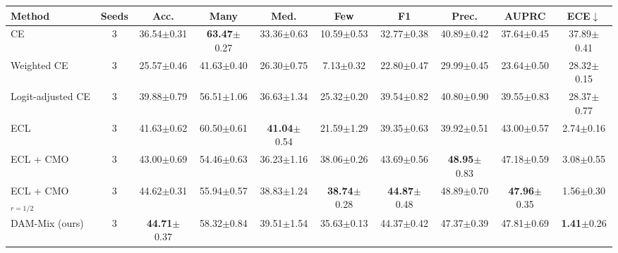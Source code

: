 \begin{tabular}{l c cccccccc}
\toprule
Method & Seeds & Acc. & Many & Med. & Few & F1 & Prec. & AUPRC & ECE$\downarrow$ \\
\midrule
CE & 3 & 36.54{\scriptsize$\pm$0.31} & \textbf{63.47}{\scriptsize$\pm$0.27} & 33.36{\scriptsize$\pm$0.63} & 10.59{\scriptsize$\pm$0.53} & 32.77{\scriptsize$\pm$0.38} & 40.89{\scriptsize$\pm$0.42} & 37.64{\scriptsize$\pm$0.45} & 37.89{\scriptsize$\pm$0.41} \\
Weighted CE & 3 & 25.57{\scriptsize$\pm$0.46} & 41.63{\scriptsize$\pm$0.40} & 26.30{\scriptsize$\pm$0.75} & 7.13{\scriptsize$\pm$0.32} & 22.80{\scriptsize$\pm$0.47} & 29.99{\scriptsize$\pm$0.45} & 23.64{\scriptsize$\pm$0.50} & 28.32{\scriptsize$\pm$0.15} \\
Logit-adjusted CE & 3 & 39.88{\scriptsize$\pm$0.79} & 56.51{\scriptsize$\pm$1.06} & 36.63{\scriptsize$\pm$1.34} & 25.32{\scriptsize$\pm$0.20} & 39.54{\scriptsize$\pm$0.82} & 40.80{\scriptsize$\pm$0.90} & 39.55{\scriptsize$\pm$0.83} & 28.37{\scriptsize$\pm$0.77} \\
ECL & 3 & 41.63{\scriptsize$\pm$0.62} & 60.50{\scriptsize$\pm$0.61} & \textbf{41.04}{\scriptsize$\pm$0.54} & 21.59{\scriptsize$\pm$1.29} & 39.35{\scriptsize$\pm$0.63} & 39.92{\scriptsize$\pm$0.51} & 43.00{\scriptsize$\pm$0.57} & 2.74{\scriptsize$\pm$0.16} \\
ECL + CMO & 3 & 43.00{\scriptsize$\pm$0.69} & 54.46{\scriptsize$\pm$0.63} & 36.23{\scriptsize$\pm$1.16} & 38.06{\scriptsize$\pm$0.26} & 43.69{\scriptsize$\pm$0.56} & \textbf{48.95}{\scriptsize$\pm$0.83} & 47.18{\scriptsize$\pm$0.59} & 3.08{\scriptsize$\pm$0.55} \\
ECL + CMO$_{r=1/2}$ & 3 & 44.62{\scriptsize$\pm$0.31} & 55.94{\scriptsize$\pm$0.57} & 38.83{\scriptsize$\pm$1.24} & \textbf{38.74}{\scriptsize$\pm$0.28} & \textbf{44.87}{\scriptsize$\pm$0.48} & 48.89{\scriptsize$\pm$0.70} & \textbf{47.96}{\scriptsize$\pm$0.35} & 1.56{\scriptsize$\pm$0.30} \\
\midrule
DAM-Mix (ours) & 3 & \textbf{44.71}{\scriptsize$\pm$0.37} & 58.32{\scriptsize$\pm$0.84} & 39.51{\scriptsize$\pm$1.54} & 35.63{\scriptsize$\pm$0.13} & 44.37{\scriptsize$\pm$0.42} & 47.37{\scriptsize$\pm$0.39} & 47.81{\scriptsize$\pm$0.69} & \textbf{1.41}{\scriptsize$\pm$0.26} \\
\bottomrule
\end{tabular}
